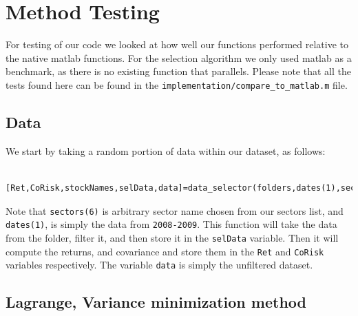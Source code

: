 \documentclass[12pt,titlepage,letter]{article}
\begin{document}
\section{Method Testing}

	\begin{par}
		For testing of our code we looked at how well our functions performed relative to the native matlab functions. For the selection algorithm we only used matlab as a benchmark, as there is no existing function that parallels. Please note that all the tests found here can be found in the \texttt{implementation/compare\_to\_matlab.m} file.
	\end{par} \vspace{1em}

	\subsection{Data}

	\begin{par}
		We start by taking a random portion of data within our dataset, as follows:
	\end{par}
	\begin{verbatim}
		[Ret,CoRisk,stockNames,selData,data]=data_selector(folders,dates(1),sectors(6));
	\end{verbatim}
	\begin{par}
		Note that \texttt{sectors(6)} is arbitrary sector name chosen from our sectors list, and \texttt{dates(1)}, is simply the data from \texttt{2008-2009}. This function will take the data from the folder, filter it, and then store it in the \texttt{selData} variable. Then it will compute the returns, and covariance and store them in the \texttt{Ret} and \texttt{CoRisk} variables respectively. The variable \texttt{data} is simply the unfiltered dataset.
	\end{par} \vspace{1em}

	\subsection{Lagrange, Variance minimization method}
\end{document}
